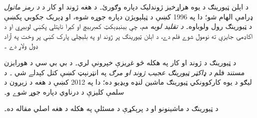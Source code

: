 \documentclass[../../../include/open-logic-section]{subfiles}
\begin{document}
\begin{reading}
د اېلن ټيورينګ د يوه هراړخيز
ژوندليک دپاره \citet{Hodges2014}
وګورئ۔ د هغه ژوند او کار د
\emph{د رمز ماتول} ډرامې الهام
شو؛ دا په 1996 کښې د ټېلېويژن
دپاره جوړه شوه، او ډېريک جکوبي
پکښې د ټيورينګ رول ولوباوه۔
\emph{د تقليد لوبه} هم، چې
بېنېډېکټ کمبربېچ او کېرا نايتلي
پکښې لوبېږي او د اکاډمۍ جايزې
ته نومول شوے فلم دے، د اېلن
ټيورينګ پر ژوند او په بلېچلي
پارک کښې پر وخت په آزاد ډول
ولاړ دے \citep{Imitation2014}۔

\citet{Radiolab2012} د ټيورينګ د
ژوند او کار په هکله څو غږيزې
خپرونې لري۔ د بي بي سي د
هورايزن مستند فلم \emph{د ډاکټر
ټيورينګ عجيب ژوند او مرګ} په
انټرنېټ کښې کتل کېدلے شي
\citep{Sykes1992}۔ \citep{Theelen2012}
د ليګو د يوه کارکوونکي ټيورينګ
ماشين لنډه ويډيو ده؛ دا په
2012 کښې د هغه د زېږون د
سلمې کليزې د درناوي دپاره
جوړ شوے و۔

د ټيورينګ د ماشينونو او د پرېکړې
د مسئلې په هکله د هغه اصلي
مقاله \citet{Turing1937} ده۔
\end{reading}
\end{document}
